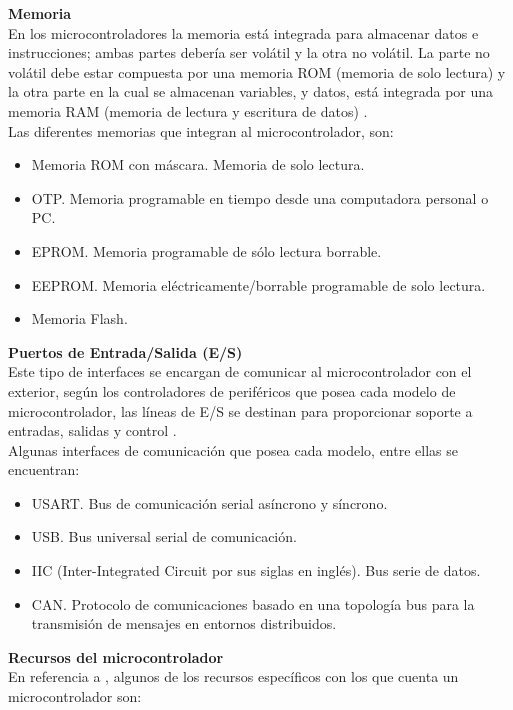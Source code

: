 \textbf{Memoria} \\
En los microcontroladores la memoria está integrada para almacenar datos e 
instrucciones; ambas partes debería ser volátil y la otra no volátil. La parte 
no volátil debe estar compuesta por una memoria ROM (memoria de solo lectura) y 
la otra parte en la cual se almacenan variables, y datos, está integrada por una 
memoria RAM (memoria de lectura y escritura de datos) 
\cite{info_microcontroladores}. \\
Las diferentes memorias que integran al microcontrolador, son: 

\begin{itemize}
	\item Memoria ROM con máscara. Memoria de solo lectura. 
	\item OTP. Memoria programable en tiempo desde una computadora personal 
	o PC.
	\item EPROM. Memoria programable de sólo lectura borrable.
	\item EEPROM. Memoria eléctricamente/borrable programable de solo 
	lectura.
	\item Memoria Flash.
\end{itemize}

\textbf{Puertos de Entrada/Salida (E/S)} \\
Este tipo de interfaces se encargan de comunicar al microcontrolador con el 
exterior, según los controladores de periféricos que posea cada modelo de 
microcontrolador, las líneas de E/S se destinan para proporcionar soporte a 
entradas, salidas y control \cite{info_microcontroladores}. \\
Algunas interfaces de comunicación que posea cada modelo, entre ellas se 
encuentran:

\begin{itemize}
	\item USART. Bus de comunicación serial asíncrono y síncrono.
	\item USB. Bus universal serial de comunicación.
	\item IIC (Inter-Integrated Circuit por sus siglas en 
		inglés). Bus serie de datos.
	\item CAN. Protocolo de comunicaciones basado en una topología bus para 
		la transmisión de mensajes en entornos distribuidos.
\end{itemize}

\textbf{Recursos del microcontrolador} \\
En referencia a \cite{info_microcontroladores}, algunos de los recursos 
específicos con los que cuenta un microcontrolador son:

